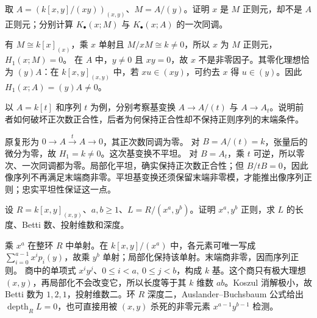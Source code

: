 \begin{exercise}\label{g5:ex:module-regular-not-ring}
	取 \(A=(k[x,y]/(xy))_{(x,y)}\)、\(M=A/(y)\)。证明 \(x\) 是 \(M\) 正则元，却不是 \(A\) 正则元；分别计算 \(K_\bullet(x;M)\) 与 \(K_\bullet(x;A)\) 的一次同调。
\end{exercise}
\begin{solution}
	有 \(M\cong k[x]_{(x)}\)，乘 \(x\) 单射且 \(M/xM\cong k\ne0\)，所以 \(x\) 为 \(M\) 正则元，\(H_1(x;M)=0\)。
	在 \(A\) 中，\(y\ne0\) 且 \(xy=0\)，故 \(x\) 不是非零因子。其零化理想恰为 \((y)A\)：在 \(k[x,y]_{(x,y)}\) 中，若 \(xu\in(xy)\)，可约去 \(x\) 得 \(u\in(y)\)。因此 \(H_1(x;A)=(y)A\ne0\)。
\end{solution}

\begin{exercise}\label{g5:ex:koszul-base-change-limits}
	以 \(A=k[t]\) 和序列 \(t\) 为例，分别考察基变换 \(A\to A/(t)\) 与 \(A\to A_t\)。说明前者如何破坏正次数正合性，后者为何保持正合性却不保持正则序列的末端条件。
\end{exercise}
\begin{solution}
	原复形为 \(0\to A\xrightarrow{t}A\to0\)，其正次数同调为零。
	对 \(B=A/(t)=k\)，张量后的微分为零，故 \(H_1=k\ne0\)。这次基变换不平坦。
	对 \(B=A_t\)，乘 \(t\) 可逆，所以零次、一次同调都为零。局部化平坦，确实保持正次数正合性；但 \(B/tB=0\)，因此像序列不再满足末端商非零。平坦基变换还须保留末端非零模，才能推出像序列正则；忠实平坦性保证这一点。
\end{solution}

\begin{exercise}\label{g5:ex:monomial-complete-intersection}
	设 \(R=k[x,y]_{(x,y)}\)、\(a,b\geq1\)、\(L=R/(x^a,y^b)\)。证明 \(x^a,y^b\) 正则，求 \(L\) 的长度、Betti 数、投射维数和深度。
\end{exercise}
\begin{solution}
	乘 \(x^a\) 在整环 \(R\) 中单射。在 \(k[x,y]/(x^a)\) 中，各元素可唯一写成 \(\sum_{i=0}^{a-1}x^ip_i(y)\)，故乘 \(y^b\) 单射；局部化保持该单射。末端商非零，因而序列正则。
	商中的单项式 \(x^iy^j\)、\(0\leq i<a,\ 0\leq j<b\)，构成 \(k\) 基。这个商只有极大理想 \((x,y)\)，再局部化不会改变它，所以长度等于其 \(k\) 维数 \(ab\)。Koszul 消解极小，故 Betti 数为 \(1,2,1\)，投射维数二。环 \(R\) 深度二，Auslander–Buchsbaum 公式给出 \(\operatorname{depth}_R L=0\)，也可直接用被 \((x,y)\) 杀死的非零元素 \(x^{a-1}y^{b-1}\) 检测。
\end{solution}

